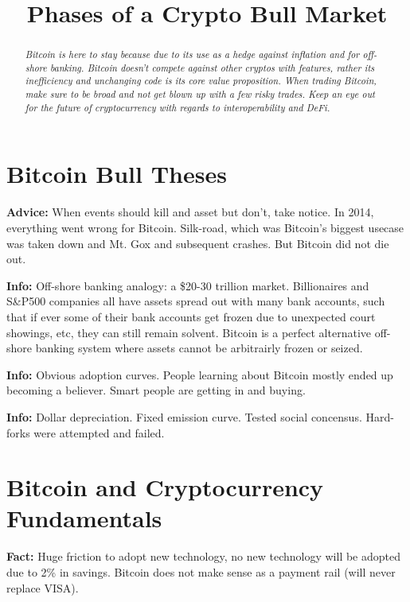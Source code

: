 \documentclass[10pt,twocolumn]{article}
\title{\textbf{Phases of a Crypto Bull Market\vspace{-2em}}}
\date{}
\begin{document}
\setlength{\parskip}{10px}%
\setlength{\parindent}{0pt}
\setlength{\footskip}{1.5em}
\maketitle
\begin{abstract}
{\em Bitcoin is here to stay because due to its use as a hedge against inflation
and for off-shore banking. Bitcoin doesn't compete against other cryptos with
features, rather its inefficiency and unchanging code is its core value
proposition. When trading Bitcoin, make sure to be broad and not get blown up
with a few risky trades. Keep an eye out for the future of cryptocurrency with
regards to interoperability and DeFi.}
\end{abstract}

\section{Bitcoin Bull Theses}

\textbf{Advice:} When events should kill and asset but don't, take notice. In 2014,
everything went wrong for Bitcoin. Silk-road, which was Bitcoin's biggest
usecase was taken down and Mt. Gox and subsequent crashes. But Bitcoin did not
die out. 

\textbf{Info:} Off-shore banking analogy: a \$20-30 trillion market.
Billionaires and S\&P500 companies all have assets spread out with many bank
accounts, such that if ever some of their bank accounts get frozen due to
unexpected court showings, etc, they can still remain solvent. Bitcoin is a
perfect alternative off-shore banking system where assets cannot be arbitrairly
frozen or seized. 

\textbf{Info:} Obvious adoption curves. People learning about Bitcoin mostly ended
up becoming a believer. Smart people are getting in and buying. 

\textbf{Info:} Dollar depreciation. Fixed emission curve. Tested social
concensus. Hard-forks were attempted and failed. 

\section{Bitcoin and Cryptocurrency Fundamentals}

\textbf{Fact:} Huge friction to adopt new technology, no new technology will be
adopted due to 2\% in savings. Bitcoin does not make sense as a payment rail
(will never replace VISA). 
\end{document}

